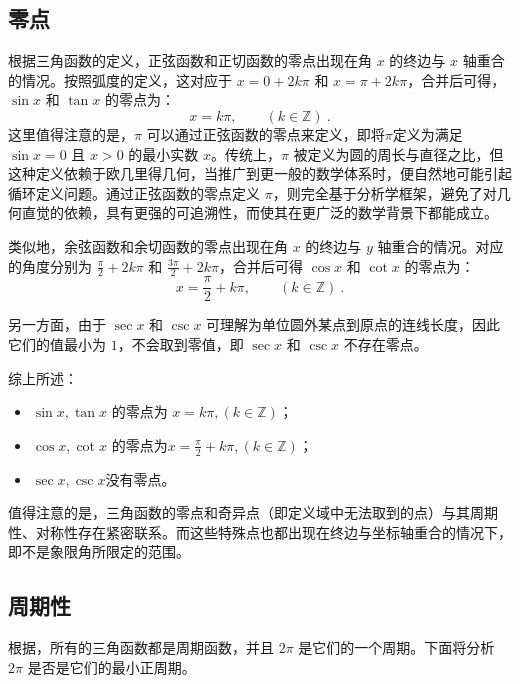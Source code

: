 \subsection{零点}

根据三角函数的定义，正弦函数和正切函数的零点出现在角 $x$ 的终边与 $x$ 轴重合的情况。按照弧度的定义，这对应于 $x = 0+2k\pi$ 和 $x = \pi+2k\pi$，合并后可得， $\sin x$ 和 $\tan x$ 的零点为：
\begin{equation}\label{eq_HsTFFv_1}
x = k\pi, \qquad (k\in\mathbb{Z})~.
\end{equation}
这里值得注意的是，$\pi$ 可以通过正弦函数的零点来定义，即将$\pi$定义为满足 $\sin x = 0$ 且 $x > 0$ 的最小实数 $x$。传统上，$\pi$ 被定义为圆的周长与直径之比，但这种定义依赖于欧几里得几何，当推广到更一般的数学体系时，便自然地可能引起循环定义问题。通过正弦函数的零点定义 $\pi$，则完全基于分析学框架，避免了对几何直觉的依赖，具有更强的可追溯性，而使其在更广泛的数学背景下都能成立。

类似地，余弦函数和余切函数的零点出现在角 $x$ 的终边与 $y$ 轴重合的情况。对应的角度分别为 $\displaystyle{\frac{\pi}{2}} + 2k\pi$ 和 $\displaystyle{\frac{3\pi}{2}} + 2k\pi$，合并后可得 $\cos x$ 和 $\cot x$ 的零点为：
\begin{equation}
x = \frac{\pi}{2} + k\pi, \qquad (k\in\mathbb{Z})~.
\end{equation}

另一方面，由于 $\sec x$ 和 $\csc x$ 可理解为单位圆外某点到原点的连线长度，因此它们的值最小为 $1$，不会取到零值，即 $\sec x$ 和 $\csc x$ 不存在零点。

综上所述：
\begin{itemize}
\item $\sin x, \tan x$ 的零点为 $x = k\pi, (k\in\mathbb{Z})$；
\item $\cos x, \cot x$ 的零点为$\displaystyle x = \frac{\pi}{2} + k\pi, (k\in\mathbb{Z})$；
\item $\sec x, \csc x$没有零点。
\end{itemize}

值得注意的是，三角函数的零点和奇异点（即定义域中无法取到的点）与其周期性、对称性存在紧密联系。而这些特殊点也都出现在终边与坐标轴重合的情况下，即不是象限角所限定的范围。

\subsection{周期性}

根据，所有的三角函数都是周期函数，并且 $2\pi$ 是它们的一个周期。下面将分析 $2\pi$ 是否是它们的最小正周期。

